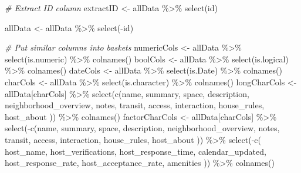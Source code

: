 \documentclass[
]{article}
\newenvironment{Shaded}{\begin{snugshade}}{\end{snugshade}}
\newcommand{\CommentTok}[1]{\textcolor[rgb]{0.56,0.35,0.01}{\textit{#1}}}
\newcommand{\FunctionTok}[1]{\textcolor[rgb]{0.00,0.00,0.00}{#1}}
\newcommand{\NormalTok}[1]{#1}
\newcommand{\OtherTok}[1]{\textcolor[rgb]{0.56,0.35,0.01}{#1}}
\newcommand{\SpecialCharTok}[1]{\textcolor[rgb]{0.00,0.00,0.00}{#1}}
\begin{document}
\begin{Shaded}
\begin{Highlighting}[]
\CommentTok{\# Extract ID column }
\NormalTok{extractID }\OtherTok{\textless{}{-}}\NormalTok{ allData }\SpecialCharTok{\%\textgreater{}\%} \FunctionTok{select}\NormalTok{(id)}

\NormalTok{allData }\OtherTok{\textless{}{-}}\NormalTok{ allData }\SpecialCharTok{\%\textgreater{}\%} \FunctionTok{select}\NormalTok{(}\SpecialCharTok{{-}}\NormalTok{id)}

\CommentTok{\# Put similar columns into baskets }
\NormalTok{numericCols }\OtherTok{\textless{}{-}}\NormalTok{ allData }\SpecialCharTok{\%\textgreater{}\%} \FunctionTok{select}\NormalTok{(is.numeric) }\SpecialCharTok{\%\textgreater{}\%} \FunctionTok{colnames}\NormalTok{()}
\NormalTok{boolCols }\OtherTok{\textless{}{-}}\NormalTok{ allData }\SpecialCharTok{\%\textgreater{}\%} \FunctionTok{select}\NormalTok{(is.logical) }\SpecialCharTok{\%\textgreater{}\%} \FunctionTok{colnames}\NormalTok{()}
\NormalTok{dateCols }\OtherTok{\textless{}{-}}\NormalTok{ allData }\SpecialCharTok{\%\textgreater{}\%} \FunctionTok{select}\NormalTok{(is.Date) }\SpecialCharTok{\%\textgreater{}\%} \FunctionTok{colnames}\NormalTok{()}
\NormalTok{charCols }\OtherTok{\textless{}{-}}\NormalTok{ allData }\SpecialCharTok{\%\textgreater{}\%} \FunctionTok{select}\NormalTok{(is.character) }\SpecialCharTok{\%\textgreater{}\%} \FunctionTok{colnames}\NormalTok{()}
\NormalTok{longCharCols }\OtherTok{\textless{}{-}}
\NormalTok{  allData[charCols] }\SpecialCharTok{\%\textgreater{}\%} 
  \FunctionTok{select}\NormalTok{(}\FunctionTok{c}\NormalTok{(name, }
\NormalTok{      summary, }
\NormalTok{      space, }
\NormalTok{      description, }
\NormalTok{      neighborhood\_overview, }
\NormalTok{      notes, }
\NormalTok{      transit, }
\NormalTok{      access, }
\NormalTok{      interaction, }
\NormalTok{      house\_rules, }
\NormalTok{      host\_about}
\NormalTok{  )) }\SpecialCharTok{\%\textgreater{}\%} 
  \FunctionTok{colnames}\NormalTok{()}
\NormalTok{factorCharCols }\OtherTok{\textless{}{-}} 
\NormalTok{  allData[charCols] }\SpecialCharTok{\%\textgreater{}\%} 
  \FunctionTok{select}\NormalTok{(}\SpecialCharTok{{-}}\FunctionTok{c}\NormalTok{(name, }
\NormalTok{      summary, }
\NormalTok{      space, }
\NormalTok{      description, }
\NormalTok{      neighborhood\_overview, }
\NormalTok{      notes, }
\NormalTok{      transit, }
\NormalTok{      access, }
\NormalTok{      interaction, }
\NormalTok{      house\_rules, }
\NormalTok{      host\_about}
\NormalTok{  )) }\SpecialCharTok{\%\textgreater{}\%} 
  \FunctionTok{select}\NormalTok{(}\SpecialCharTok{{-}}\FunctionTok{c}\NormalTok{(}
\NormalTok{    host\_name, }
\NormalTok{    host\_verifications, }
\NormalTok{    host\_response\_time,}
\NormalTok{    calendar\_updated, }
\NormalTok{    host\_response\_rate, }
\NormalTok{    host\_acceptance\_rate, }
\NormalTok{    amenities}
\NormalTok{  )) }\SpecialCharTok{\%\textgreater{}\%} 
  \FunctionTok{colnames}\NormalTok{()}


\end{Highlighting}
\end{Shaded}
\end{document}
